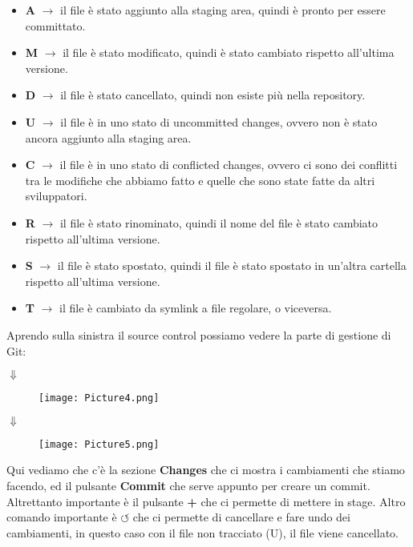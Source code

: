 \documentclass[a4paper,12pt]{article}
\begin{document}
\begin{itemize}
    \item \textbf{A} $\rightarrow$ il file è stato aggiunto alla staging area, quindi è pronto per essere committato.
    \item \textbf{M} $\rightarrow$ il file è stato modificato, quindi è stato cambiato rispetto all'ultima versione.
    \item \textbf{D} $\rightarrow$ il file è stato cancellato, quindi non esiste più nella repository.
    \item \textbf{U} $\rightarrow$ il file è in uno stato di uncommitted changes, ovvero non è stato ancora aggiunto alla staging area.
    \item \textbf{C} $\rightarrow$ il file è in uno stato di conflicted changes, ovvero ci sono dei conflitti tra le modifiche che abbiamo fatto e quelle che sono state fatte da altri sviluppatori.
    \item \textbf{R} $\rightarrow$ il file è stato rinominato, quindi il nome del file è stato cambiato rispetto all'ultima versione.
    \item \textbf{S} $\rightarrow$ il file è stato spostato, quindi il file è stato spostato in un'altra cartella rispetto all'ultima versione.
    \item \textbf{T} $\rightarrow$ il file è cambiato da symlink a file regolare, o viceversa.
\end{itemize}
Aprendo sulla sinistra il source control possiamo vedere la parte di gestione di Git:
\begin{center}
    $\Downarrow$
\end{center}
\begin{figure}[H]
  \centering
  \texttt{[image: Picture4.png]}
  \label{etichetta4}
\end{figure}
\begin{center}
    $\Downarrow$
\end{center}
\begin{figure}[H]
  \centering
  \texttt{[image: Picture5.png]}
  \label{etichetta5}
\end{figure}
Qui vediamo che c'è la sezione \textbf{Changes} che ci mostra i cambiamenti che stiamo facendo, ed il pulsante \textbf{Commit} che serve appunto per creare un commit.
Altrettanto importante è il pulsante \textbf{+} che ci permette di mettere in stage.
Altro comando importante è $\circlearrowleft $ che ci permette di cancellare e fare undo dei cambiamenti, in questo caso con il file non tracciato (U), il file viene cancellato.
\end{document}
